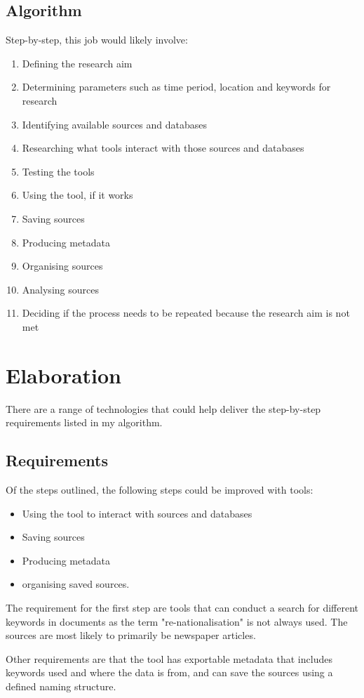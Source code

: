 \documentclass{article}
\begin{document}
\subsection*{Algorithm}
Step-by-step, this job would likely involve:
\begin{enumerate}
\item Defining the research aim
\item Determining parameters such as time period, location and keywords for research
\item Identifying available sources and databases
\item Researching what tools interact with those sources and databases
\item Testing the tools
\item Using the tool, if it works
\item Saving sources
\item Producing metadata
\item Organising sources
\item Analysing sources
\item Deciding if the process needs to be repeated because the research aim is not met
\end{enumerate}

\section*{Elaboration}

There are a range of technologies that could help deliver the step-by-step requirements listed in my algorithm.

\subsection*{Requirements}

Of the steps outlined, the following steps could be improved with tools:
\begin{itemize}
\item Using the tool to interact with sources and databases
\item Saving sources
\item Producing metadata
\item organising saved sources.
\end{itemize}\par

The requirement for the first step are tools that can conduct a search for different keywords in documents as the term "re-nationalisation" is not always used. The sources are most likely to primarily be newspaper articles.\par
Other requirements are that the tool has exportable metadata that includes keywords used and where the data is from, and can save the sources using a defined naming structure.
\par
\end{document}
